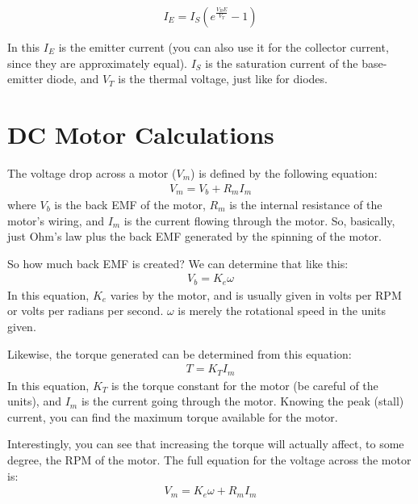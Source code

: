 \begin{equation}
I_E = I_S(e^{\frac{V_BE}{V_T}} - 1)
\end{equation}

In this $I_E$ is the emitter current (you can also use it for the collector current, since they are approximately equal).
$I_S$ is the saturation current of the base-emitter diode, and $V_T$ is the thermal voltage, just like for diodes.


\section{DC Motor Calculations}
\label{appDCMotorCalculations}

The voltage drop across a motor ($V_m$) is defined by the following equation:
\begin{align*}
V_m = V_b + R_m I_m
\end{align*}
where $V_b$ is the back EMF of the motor, $R_m$ is the internal resistance of the motor's wiring, and $I_m$ is the current flowing through the motor.
So, basically, just Ohm's law plus the back EMF generated by the spinning of the motor.

So how much back EMF is created?  We can determine that like this:
\begin{align*}
V_b = K_e \omega
\end{align*}
In this equation, $K_e$ varies by the motor, and is usually given in volts per RPM or volts per radians per second.
$\omega$ is merely the rotational speed in the units given.

Likewise, the torque generated can be determined from this equation:
\begin{align*}
T = K_T I_m
\end{align*}
In this equation, $K_T$ is the torque constant for the motor (be careful of the units), and $I_m$ is the current going through the motor.
Knowing the peak (stall) current, you can find the maximum torque available for the motor.

Interestingly, you can see that increasing the torque will actually affect, to some degree, the RPM of the motor.
The full equation for the voltage across the motor is:
\begin{align*}
V_m = K_e \omega + R_m I_m
\end{align*}

